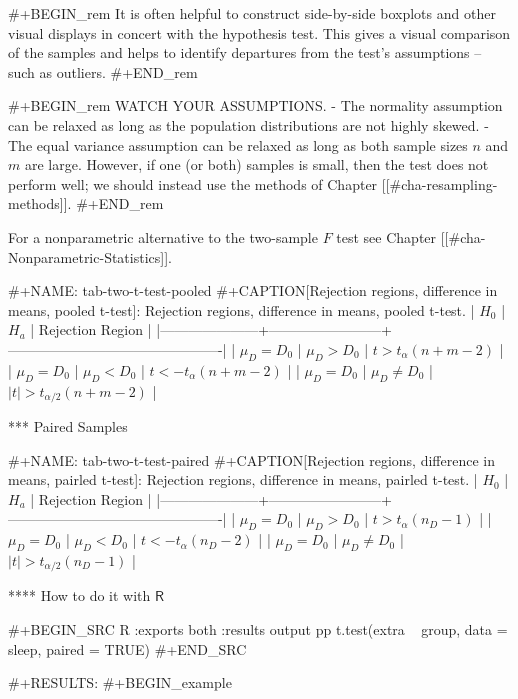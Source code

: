 #+BEGIN_rem
It is often helpful to construct side-by-side boxplots and other
visual displays in concert with the hypothesis test. This gives a
visual comparison of the samples and helps to identify departures from
the test's assumptions -- such as outliers.
#+END_rem

#+BEGIN_rem
WATCH YOUR ASSUMPTIONS.
- The normality assumption can be relaxed as long as the population
  distributions are not highly skewed.
- The equal variance assumption can be relaxed as long as both sample
  sizes \(n\) and \(m\) are large. However, if one (or both) samples
  is small, then the test does not perform well; we should instead use
  the methods of Chapter [[#cha-resampling-methods]].
#+END_rem

For a nonparametric alternative to the two-sample \(F\) test see
Chapter [[#cha-Nonparametric-Statistics]].

#+NAME: tab-two-t-test-pooled
#+CAPTION[Rejection regions, difference in means, pooled t-test]: Rejection regions, difference in means, pooled t-test.
| \(H_{0}\)           | \(H_{a}\)              | Rejection Region                             |
|---------------------+------------------------+----------------------------------------------|
| \(\mu_{D} = D_{0}\) | \(\mu_{D} > D_{0}\)    | \(t > t_{\alpha}(n + m - 2)\)                |
| \(\mu_{D} = D_{0}\) | \(\mu_{D} < D_{0}\)    | \(t < -t_{\alpha}(n + m -  2)\)              |
| \(\mu_{D} = D_{0}\) | \(\mu_{D} \neq D_{0}\) | \( \vert t \vert > t_{\alpha/2}(n + m - 2)\) |


*** Paired Samples

#+NAME: tab-two-t-test-paired
#+CAPTION[Rejection regions, difference in means, pairled t-test]: Rejection regions, difference in means, pairled t-test.
| \(H_{0}\)           | \(H_{a}\)              | Rejection Region                             |
|---------------------+------------------------+----------------------------------------------|
| \(\mu_{D} = D_{0}\) | \(\mu_{D} > D_{0}\)    | \(t > t_{\alpha}(n_{D} - 1)\)                |
| \(\mu_{D} = D_{0}\) | \(\mu_{D} < D_{0}\)    | \(t < -t_{\alpha}(n_{D} - 2)\)               |
| \(\mu_{D} = D_{0}\) | \(\mu_{D} \neq D_{0}\) | \( \vert t \vert > t_{\alpha/2}(n_{D} - 1)\) |


**** How to do it with \(\mathsf{R}\)

#+BEGIN_SRC R :exports both :results output pp 
t.test(extra ~ group, data = sleep, paired = TRUE)
#+END_SRC

#+RESULTS:
#+BEGIN_example

